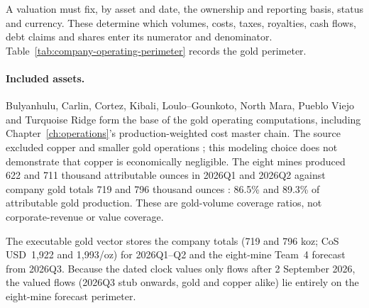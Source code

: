 A valuation must fix, by asset and date, the ownership and reporting basis,
status and currency. These determine which volumes, costs, taxes, royalties,
cash flows, debt claims and shares enter its numerator and denominator.
Table~\ref{tab:company-operating-perimeter} records the gold perimeter.

\paragraph{Included assets.}
Bulyanhulu, Carlin, Cortez, Kibali, Loulo--Gounkoto, North Mara, Pueblo Viejo
and Turquoise Ridge form the base of the gold operating computations,
including Chapter~\ref{ch:operations}'s production-weighted cost master chain. The source
excluded copper and smaller gold operations \cite{team4}; this modeling
choice does not demonstrate that copper is economically negligible.
The eight mines produced 622 and 711 thousand attributable ounces in 2026Q1
and 2026Q2 against company gold totals 719 and 796 thousand ounces
\cite{barrick-mine-stats-2026}: 86.5\% and 89.3\% of attributable gold production. These are
gold-volume coverage ratios, not corporate-revenue or value coverage.

The executable gold vector stores the company totals (719 and 796 koz; CoS
USD~1,922 and 1,993/oz) for 2026Q1--Q2 and the eight-mine Team~4 forecast
from 2026Q3. Because the dated clock values only flows after 2 September 2026,
the valued flows (2026Q3 stub onwards, gold and copper alike) lie entirely on
the eight-mine forecast perimeter.

